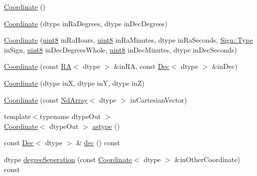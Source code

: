 \begin{DoxyCompactItemize}
\item 
\mbox{\hyperlink{class_num_c_1_1_coordinates_1_1_coordinate_ae32aea9949fa7f836660caeded649176}{Coordinate}} ()
\item 
\mbox{\hyperlink{class_num_c_1_1_coordinates_1_1_coordinate_a64de27c4f1b7713c17e0335d75ec92c3}{Coordinate}} (dtype in\+Ra\+Degrees, dtype in\+Dec\+Degrees)
\item 
\mbox{\hyperlink{class_num_c_1_1_coordinates_1_1_coordinate_ac41f6813f65934fedb7f9a10b5ed90d6}{Coordinate}} (\mbox{\hyperlink{namespace_num_c_a60b2e2f49e1ff61059731c154e560869}{uint8}} in\+Ra\+Hours, \mbox{\hyperlink{namespace_num_c_a60b2e2f49e1ff61059731c154e560869}{uint8}} in\+Ra\+Minutes, dtype in\+Ra\+Seconds, \mbox{\hyperlink{struct_num_c_1_1_coordinates_1_1_sign_a915938d7fce678936d8728ca14a70e22}{Sign\+::\+Type}} in\+Sign, \mbox{\hyperlink{namespace_num_c_a60b2e2f49e1ff61059731c154e560869}{uint8}} in\+Dec\+Degrees\+Whole, \mbox{\hyperlink{namespace_num_c_a60b2e2f49e1ff61059731c154e560869}{uint8}} in\+Dec\+Minutes, dtype in\+Dec\+Seconds)
\item 
\mbox{\hyperlink{class_num_c_1_1_coordinates_1_1_coordinate_a5bd79340ba2617beed44f80392babd12}{Coordinate}} (const \mbox{\hyperlink{class_num_c_1_1_coordinates_1_1_r_a}{RA}}$<$ dtype $>$ \&in\+RA, const \mbox{\hyperlink{class_num_c_1_1_coordinates_1_1_dec}{Dec}}$<$ dtype $>$ \&in\+Dec)
\item 
\mbox{\hyperlink{class_num_c_1_1_coordinates_1_1_coordinate_a5d53ed06a21ccce8c3851c36c1e5467e}{Coordinate}} (dtype inX, dtype inY, dtype inZ)
\item 
\mbox{\hyperlink{class_num_c_1_1_coordinates_1_1_coordinate_a820e23a9ef07eef82321366e61cfb441}{Coordinate}} (const \mbox{\hyperlink{class_num_c_1_1_nd_array}{Nd\+Array}}$<$ dtype $>$ in\+Cartesian\+Vector)
\item 
{\footnotesize template$<$typename dtype\+Out $>$ }\\\mbox{\hyperlink{class_num_c_1_1_coordinates_1_1_coordinate}{Coordinate}}$<$ dtype\+Out $>$ \mbox{\hyperlink{class_num_c_1_1_coordinates_1_1_coordinate_ab892940ffb40e8d5091ac465872ec56d}{astype}} ()
\item 
const \mbox{\hyperlink{class_num_c_1_1_coordinates_1_1_dec}{Dec}}$<$ dtype $>$ \& \mbox{\hyperlink{class_num_c_1_1_coordinates_1_1_coordinate_a04bccaa7463caf0b0222b3c667c38595}{dec}} () const
\item 
dtype \mbox{\hyperlink{class_num_c_1_1_coordinates_1_1_coordinate_aee597cfa5bb5402bd6d2c7a24578b0d0}{degree\+Seperation}} (const \mbox{\hyperlink{class_num_c_1_1_coordinates_1_1_coordinate}{Coordinate}}$<$ dtype $>$ \&in\+Other\+Coordinate) const

\end{DoxyCompactItemize}
